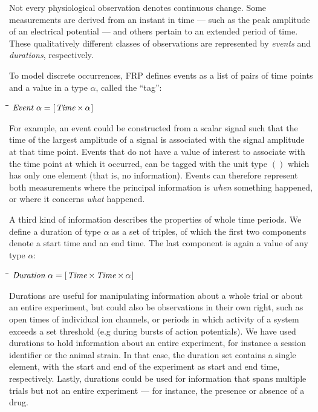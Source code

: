 \documentclass[11pt]{article}
\newlength{\lwidth}\setlength{\lwidth}{4.5cm}
\newlength{\cwidth}\setlength{\cwidth}{8mm} %
\newcommand{\Conid}[1]{\mathit{#1}}
\begin{document}
Not every physiological observation denotes continuous
change. Some measurements are derived from an instant in time --- such
as the peak amplitude of an electrical potential --- and others pertain
to an extended period of time. These qualitatively different classes
of observations are represented by \emph{events} and \emph{durations},
respectively. 

To model discrete occurrences, FRP defines events as a list of pairs
of time points and a value in a type \ensuremath{\alpha}, called the ``tag'':
\begin{tabbing}
\qquad\=\hspace{\lwidth}\=\hspace{\cwidth}\=\+\kill
${\Conid{Event}\;\alpha\mathrel{=}[\mskip1.5mu \Conid{Time}\;\!\!\times\!\!\;\alpha\mskip1.5mu]}$
\end{tabbing}For example, an event could be constructed from a scalar signal such
that the time of the largest amplitude of a signal is associated with
the signal amplitude at that time point. Events that do not have a
value of interest to associate with the time point at which it
occurred, can be tagged with the unit type \ensuremath{()} which has only one
element (that is, no information). Events can therefore represent
both measurements where the principal information is \emph{when}
something happened, or where it concerns \emph{what} happened.

A third kind of information describes the properties of whole time
periods. We define a duration of type \ensuremath{\alpha} as a set of triples, of
which the first two components denote a start time and an end
time. The last component is again a value of any type \ensuremath{\alpha}:
\begin{tabbing}
\qquad\=\hspace{\lwidth}\=\hspace{\cwidth}\=\+\kill
${\Conid{Duration}\;\alpha\mathrel{=}[\mskip1.5mu \Conid{Time}\;\!\!\times\!\!\;\Conid{Time}\;\!\!\times\!\!\;\alpha\mskip1.5mu]}$
\end{tabbing}Durations are useful for manipulating information about a whole trial
or about an entire experiment, but could also be observations in their
own right, such as open times of individual ion channels, or periods
in which activity of a system exceeds a set threshold (e.g during
bursts of action potentials). We have used durations to hold
information about an entire experiment, for instance a session
identifier or the animal strain. In that case, the duration set
contains a single element, with the start and end of the experiment as
start and end time, respectively. Lastly, durations could be used for
information that spans multiple trials but not an entire experiment
--- for instance, the presence or absence of a drug.
\end{document}
